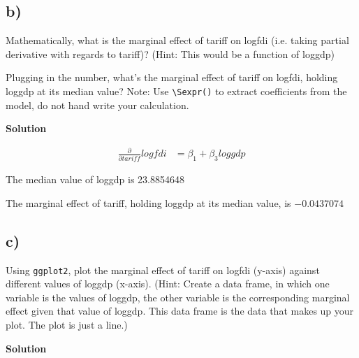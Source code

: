\documentclass{article}\usepackage[]{graphicx}\usepackage[]{color}
\begin{document}
\subsection*{b)}

Mathematically, what is the marginal effect of tariff on logfdi (i.e. taking partial derivative with regards to tariff)? (Hint: This would be a function of loggdp)

Plugging in the number, what's the marginal effect of tariff on logfdi, holding loggdp at its median value? Note: Use \verb`\Sexpr()` to extract coefficients from the model, do not hand write your calculation.

\textbf{Solution}

\begin{align}
\frac{\partial}{\partial tariff} logfdi &= \beta_1 + \beta_3 loggdp
\end{align}

The median value of loggdp is 23.8854648

The marginal effect of tariff, holding loggdp at its median value, is \ensuremath{-0.0437074}

\subsection*{c)}

Using \verb`ggplot2`, plot the marginal effect of tariff on logfdi (y-axis) against different values of loggdp (x-axis). (Hint: Create a data frame, in which one variable is the values of loggdp, the other variable is the corresponding marginal effect given that value of loggdp. This data frame is the data that makes up your plot. The plot is just a line.)

\textbf{Solution}
\end{document}
